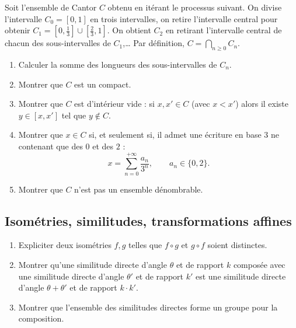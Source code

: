 \documentclass[11pt,class=report,crop=false]{standalone}
\begin{document}
\begin{exercicecours}


Soit l'ensemble de Cantor $C$ obtenu en itérant le processus suivant.
On divise l'intervalle $C_0 = [0,1]$ en trois intervalles, on retire l'intervalle central pour obtenir 
$C_1=[0,\frac13] \cup [\frac 23,1]$. On obtient $C_2$ en retirant l'intervalle central de chacun des sous-intervalles de $C_1$,\ldots
Par définition, $C = \bigcap_{n\ge0} C_n$.
\begin{enumerate}
  \item Calculer la somme des longueurs des sous-intervalles de $C_n$.
  \item Montrer que $C$ est un compact.
  \item Montrer que $C$ est d'intérieur vide : si $x,x' \in C$ (avec $x<x'$) alors il existe$y \in [x,x']$ tel que $y\notin C$.
  \item Montrer que $x\in C$ si, et seulement si, il admet une écriture en base $3$ ne contenant que des $0$ et des $2$ :
$$x = \sum_{n=0}^{+\infty} \frac{a_n}{3^n},\qquad a_n\in \{0,2\}.$$
  \item Montrer que $C$ n'est pas un ensemble dénombrable.
\end{enumerate}




\end{exercicecours}



\subsection{Isométries, similitudes, transformations affines}


\begin{exercicecours}
\sauteligne
\begin{enumerate}
 \item Expliciter deux isométries $f,g$ telles que $f\circ g$ et $g\circ f$ soient distinctes.
  \item Montrer qu'une similitude directe d'angle $\theta$ et de rapport $k$ composée 
avec une similitude directe d'angle $\theta'$ et de rapport $k'$
est une similitude directe d'angle $\theta+\theta'$ et de rapport $k\cdot k'$. 
 \item Montrer que l'ensemble des similitudes directes forme un groupe pour la composition.
\end{enumerate}
\end{exercicecours}
\end{document}
